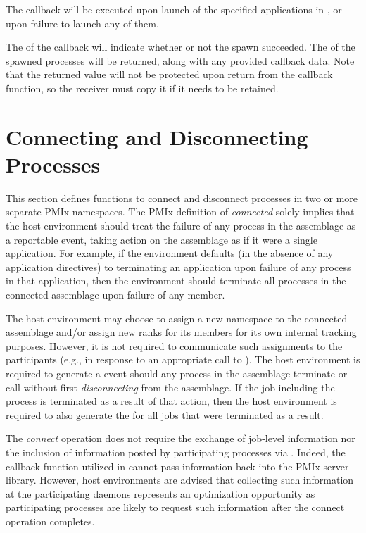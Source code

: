 \descr

The callback will be executed upon launch of the specified applications in , or upon failure to launch any of them.

The  of the callback will indicate whether or not the spawn succeeded.
The  of the spawned processes will be returned, along with any provided callback data.
Note that the returned  value will not be protected upon return from the callback function, so the receiver must copy it if it needs to be retained.


\section{Connecting and Disconnecting Processes}
\label{chap:api_proc_mgmt:connect}

This section defines functions to connect and disconnect processes in two or more separate \ac{PMIx} namespaces. The \ac{PMIx} definition of \textit{connected} solely implies that the host environment should treat the failure of any process in the assemblage as a reportable event, taking action on the assemblage as if it were a single application. For example, if the environment defaults (in the absence of any application directives) to terminating an application upon failure of any process in that application, then the environment should terminate all processes in the connected assemblage upon failure of any member.

The host environment may choose to assign a new namespace to the connected assemblage and/or assign new ranks for its members for its own internal tracking purposes. However, it is not required to communicate such assignments to the participants (e.g., in response to an appropriate call to ). The host environment is required to generate a  event should any process in the assemblage terminate or call  without first \textit{disconnecting} from the assemblage. If the job including the process is terminated as a result of that action, then the host environment is required to also generate the  for all jobs that were terminated as a result.

\advicermstart
The \textit{connect} operation does not require the exchange of job-level information nor the inclusion of information posted by  participating processes via . Indeed, the callback function utilized in  cannot pass information back into the \ac{PMIx} server library. However, host environments are advised that collecting such information at the participating daemons represents an optimization opportunity as participating processes are likely to request such information after the connect operation completes.
\advicermend

